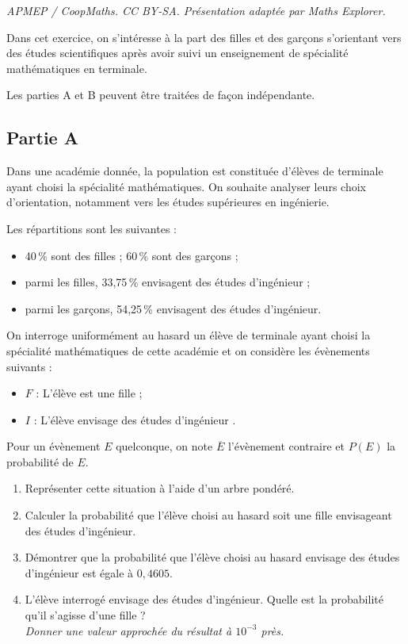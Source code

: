 \documentclass[10pt]{article}
\begin{document}
\noindent\textit{APMEP / CoopMaths. CC BY-SA. Présentation adaptée par Maths Explorer.}\par\medskip
\medskip

Dans cet exercice, on s'intéresse à la part des filles et des garçons s'orientant vers des études scientifiques après avoir suivi un enseignement de spécialité mathématiques en terminale.

 Les parties A et B peuvent être traitées de façon indépendante.

\subsection*{Partie A}

Dans une académie donnée, la population est constituée d'élèves de terminale ayant choisi la spécialité mathématiques. On souhaite analyser leurs choix d'orientation, notamment vers les études supérieures en ingénierie.

Les répartitions sont les suivantes :

\begin{itemize}[noitemsep]
\item 40\,\% sont des filles ; 60\,\% sont des garçons ;
\item parmi les filles, 33,75\,\% envisagent des études d'ingénieur ;
\item parmi les garçons, 54,25\,\% envisagent des études d'ingénieur.
\end{itemize}

On interroge uniformément au hasard un élève de terminale ayant choisi la spécialité mathématiques de cette académie et on considère les évènements suivants :
\begin{itemize}[noitemsep]
\item $F$ : \og L'élève est une fille \fg ;
\item $I$ : \og L'élève envisage des études d'ingénieur \fg.
\end{itemize}

 Pour un évènement $E$ quelconque, on note $\overline{E}$ l'évènement contraire et $P(E)$ la probabilité de $E$.

\begin{enumerate}
\item Représenter cette situation à l'aide d'un arbre pondéré.
\item Calculer la probabilité que l'élève choisi au hasard soit une fille envisageant des études d'ingénieur.
\item Démontrer que la probabilité que l'élève choisi au hasard envisage des études d'ingénieur est égale à $0{,}4605$.
\item L'élève interrogé envisage des études d'ingénieur. Quelle est la probabilité qu'il s'agisse d'une fille ?\\
\textit{Donner une valeur approchée du résultat à $10^{-3}$ près.}
\end{enumerate}
\end{document}
